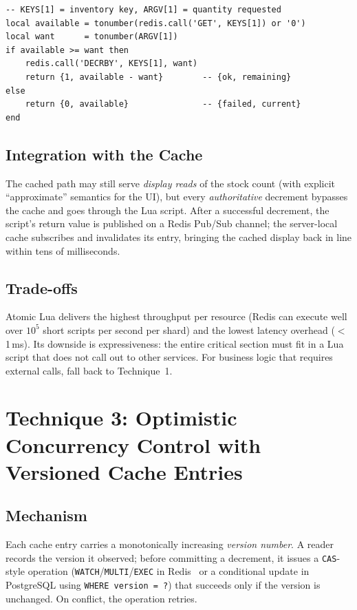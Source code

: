 \begin{lstlisting}[language={[5.2]Lua}, caption=Atomic conditional decrement (Lua / Redis)]
-- KEYS[1] = inventory key, ARGV[1] = quantity requested
local available = tonumber(redis.call('GET', KEYS[1]) or '0')
local want      = tonumber(ARGV[1])
if available >= want then
    redis.call('DECRBY', KEYS[1], want)
    return {1, available - want}        -- {ok, remaining}
else
    return {0, available}               -- {failed, current}
end
\end{lstlisting}

\subsection{Integration with the Cache}
The cached path may still serve \emph{display reads} of the stock count (with explicit ``approximate'' semantics for the UI), but every \emph{authoritative} decrement bypasses the cache and goes through the Lua script. After a successful decrement, the script's return value is published on a Redis Pub/Sub channel; the server-local cache subscribes and invalidates its entry, bringing the cached display back in line within tens of milliseconds.

\subsection{Trade-offs}
Atomic Lua delivers the highest throughput per resource (Redis can execute well over $10^5$ short scripts per second per shard) and the lowest latency overhead ($<$1\,ms). Its downside is expressiveness: the entire critical section must fit in a Lua script that does not call out to other services. For business logic that requires external calls, fall back to Technique~1.

\section{Technique 3: Optimistic Concurrency Control with Versioned Cache Entries}

\subsection{Mechanism}
Each cache entry carries a monotonically increasing \emph{version number}. A reader records the version it observed; before committing a decrement, it issues a \texttt{CAS}-style operation (\texttt{WATCH}/\texttt{MULTI}/\texttt{EXEC} in Redis~\cite{redis2024inventory} or a conditional update in PostgreSQL using \texttt{WHERE version = ?}) that succeeds only if the version is unchanged. On conflict, the operation retries.

